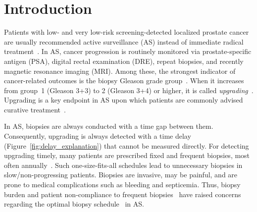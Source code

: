 
\section{Introduction}
Patients with low- and very low-risk screening-detected localized prostate cancer are usually recommended active surveillance (AS) instead of immediate radical treatment~\citep{briganti2018active}. In AS, cancer progression is routinely monitored via prostate-specific antigen (PSA), digital rectal examination (DRE), repeat biopsies, and recently magnetic resonance imaging (MRI). Among these, the strongest indicator of cancer-related outcomes is the biopsy Gleason grade group~\citep{epsteinGG2014}. When it increases from group~1 (Gleason 3+3) to 2 (Gleason 3+4) or higher, it is called \emph{upgrading}~\citep{bruinsma2017expert}. Upgrading is a key endpoint in AS upon which patients are commonly advised curative treatment~\citep{bul2013active}. 

In AS, biopsies are always conducted with a time gap between them. Consequently, upgrading is always detected with a time delay (Figure~\ref{fig:delay_explanation}) that cannot be measured directly. For detecting upgrading timely, many patients are prescribed fixed and frequent biopsies, most often annually~\cite{loeb2014heterogeneity}. Such one-size-fits-all schedules lead to unnecessary biopsies in slow/non-progressing patients. Biopsies are invasive, may be painful, and are prone to medical complications such as bleeding and septicemia\citep{loeb2013systematic}. Thus, biopsy burden and patient non-compliance to frequent biopsies~\citep{bokhorst2015compliance} have raised concerns regarding the optimal biopsy schedule~\citep{inoue2018comparative, bratt2013study} in AS.

